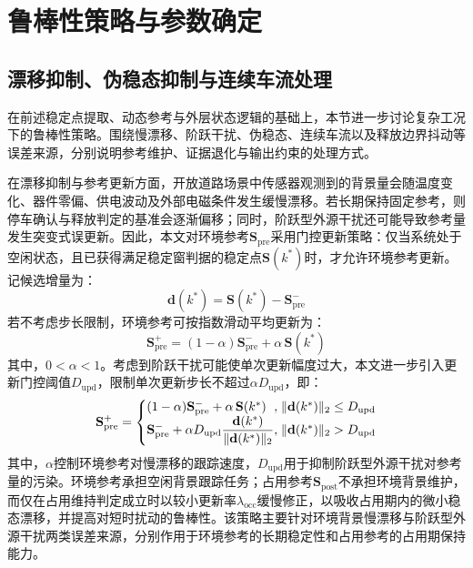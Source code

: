 \documentclass{xdupgthesis}
\begin{document}
\section{鲁棒性策略与参数确定}
\label{sec:ch4_robust}

\subsection{漂移抑制、伪稳态抑制与连续车流处理}
\label{subsec:ch4_drift_gate}

在前述稳定点提取、动态参考与外层状态逻辑的基础上，本节进一步讨论复杂工况下的鲁棒性策略。围绕慢漂移、阶跃干扰、伪稳态、连续车流以及释放边界抖动等误差来源，分别说明参考维护、证据退化与输出约束的处理方式。

在漂移抑制与参考更新方面，开放道路场景中传感器观测到的背景量会随温度变化、器件零偏、供电波动及外部电磁条件发生缓慢漂移。若长期保持固定参考，则停车确认与释放判定的基准会逐渐偏移；同时，阶跃型外源干扰还可能导致参考量发生突变式误更新\cite{ch4_zhang2020railway}。因此，本文对环境参考$\mathbf{S}_{\mathrm{pre}}$采用门控更新策略：仅当系统处于空闲状态，且已获得满足稳定窗判据的稳定点$\mathbf{S}(k^\ast)$时，才允许环境参考更新。记候选增量为：
\begin{equation}
    \mathbf{d}(k^\ast)=\mathbf{S}(k^\ast)-\mathbf{S}_{\mathrm{pre}}^{-}
\end{equation}
若不考虑步长限制，环境参考可按指数滑动平均更新为：
\begin{equation}
    \mathbf{S}_{\mathrm{pre}}^{+}=(1-\alpha)\mathbf{S}_{\mathrm{pre}}^{-}+\alpha\,\mathbf{S}(k^\ast)
\end{equation}
其中，$0<\alpha<1$。考虑到阶跃干扰可能使单次更新幅度过大，本文进一步引入更新门控阈值$D_{\mathrm{upd}}$，限制单次更新步长不超过$\alpha D_{\mathrm{upd}}$，即：
\begin{equation}
    \mathbf{S}_{\mathrm{pre}}^{+}=
    \left\{
    \begin{array}{@{}l@{,\;}l@{}}
        (1-\alpha)\mathbf{S}_{\mathrm{pre}}^{-}+\alpha\,\mathbf{S}(k^\ast)
        & \lVert\mathbf{d}(k^\ast)\rVert_2\le D_{\mathrm{upd}}\\
        \mathbf{S}_{\mathrm{pre}}^{-}+\alpha D_{\mathrm{upd}}\dfrac{\mathbf{d}(k^\ast)}{\lVert\mathbf{d}(k^\ast)\rVert_2}
        & \lVert\mathbf{d}(k^\ast)\rVert_2>D_{\mathrm{upd}}
    \end{array}
    \right.
\end{equation}
其中，$\alpha$控制环境参考对慢漂移的跟踪速度，$D_{\mathrm{upd}}$用于抑制阶跃型外源干扰对参考量的污染。环境参考承担空闲背景跟踪任务；占用参考$\mathbf{S}_{\mathrm{post}}$不承担环境背景维护，而仅在占用维持判定成立时以较小更新率$\lambda_{\mathrm{occ}}$缓慢修正，以吸收占用期内的微小稳态漂移，并提高对短时扰动的鲁棒性。该策略主要针对环境背景慢漂移与阶跃型外源干扰两类误差来源，分别作用于环境参考的长期稳定性和占用参考的占用期保持能力。
\end{document}
